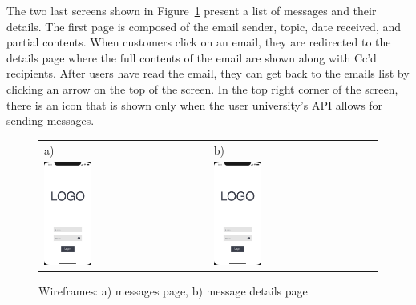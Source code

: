 The two last screens shown in Figure~\ref{fig:messages-and-details} present a list of messages and their details. The first page is composed of the email sender, topic, date received, and partial contents. When customers click on an email, they are redirected to the details page where the full contents of the email are shown along with Cc'd recipients. After users have read the email, they can get back to the emails list by clicking an arrow on the top of the screen. In the top right corner of the screen, there is an icon that is shown only when the user university's API allows for sending messages.

\begin{figure}[htb]
    \centering
    \begin{tabular}{@{}ll@{}}
        a) & b) \\
        \includegraphics[page=4,width=0.300\textwidth]{fig04/jsos_helper_wireframe.pdf} &
        \includegraphics[page=5,width=0.300\textwidth]{fig04/jsos_helper_wireframe.pdf} \\
            \end{tabular}
    \caption{Wireframes: a) messages page, b) message details page} \label{fig:messages-and-details}
\end{figure}